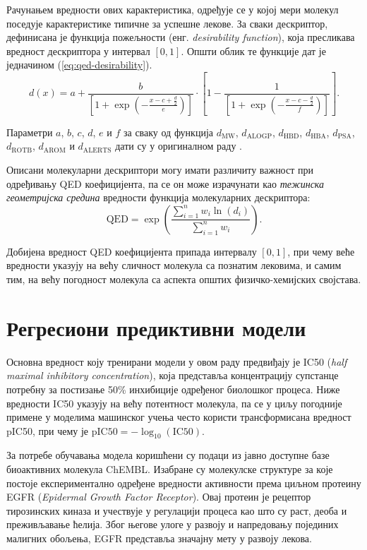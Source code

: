 \documentclass[12pt,oneside]{memoir}
\begin{document}
Рачунањем вредности ових карактеристика, одређује се у којој мери молекул поседује карактеристике типичне за успешне лекове.
За сваки дескриптор, дефинисана је функција пожељности (енг. \textit{desirability function}), која пресликава вредност дескриптора
у интервал $[0, 1]$. Општи облик те функције дат је једначином (\ref{eq:qed-desirability}).
\begin{equation}
\label{eq:qed-desirability}
d(x) = a + \frac{b}{\left[1 + \exp\left(-\frac{x - c + \frac{d}{2}}{e}\right)\right]} \cdot \left[1 - \frac{1}{\left[1 + \exp\left(-\frac{x - c - \frac{d}{2}}{f}\right)\right]}\right].
\end{equation}

Параметри $a$, $b$, $c$, $d$, $e$ и $f$ за сваку од функција $d_{\mathrm{MW}}$, $d_{\mathrm{ALOGP}}$, $d_{\mathrm{HBD}}$, $d_{\mathrm{HBA}}$, $d_{\mathrm{PSA}}$, $d_{\mathrm{ROTB}}$, $d_{\mathrm{AROM}}$ и $d_{\mathrm{ALERTS}}$ дати су у оригиналном раду \cite{Bickerton2012}.

Описани молекуларни дескриптори могу имати различиту важност при одређивању QED коефицијента, па се он може израчунати као \textit{тежинска геометријска средина} вредности функција молекуларних дескриптора:
\begin{equation}
\label{eq:qed-weighted}
\mathrm{QED} = \exp \left( \frac{\sum_{i=1}^{n} w_i \ln(d_i)}{\sum_{i=1}^{n} w_i} \right).
\end{equation}

Добијена вредност QED коефицијента припада интервалу $[0, 1]$, при чему 
веће вредности указују на већу сличност молекула са познатим лековима, 
и самим тим, на већу погодност молекула са аспекта општих 
физичко-хемијских својстава.

\section{Регресиони предиктивни модели}
\label{sec:models}

Основна 
вредност коју тренирани модели у овом раду предвиђају је IC50 
(\textit{half maximal inhibitory concentration}), која представља 
концентрацију супстанце потребну за постизање 50\% инхибиције одређеног 
биолошког процеса. Ниже вредности IC50 указују на већу потентност 
молекула, па се у циљу погодније примене у моделима машинског учења 
често користи трансформисана вредност pIC50, при чему је 
$\textrm{pIC50} = -\log_{10}(\textrm{IC50})$.

За потребе обучавања модела коришћени су подаци из јавно доступне базе 
биоактивних молекула ChEMBL. Изабране су молекулске структуре за које 
постоје експериментално одређене вредности активности према циљном 
протеину EGFR (\textit{Epidermal Growth Factor Receptor}). Овај протеин је 
рецептор тирозинских киназа и учествује у регулацији процеса као што су раст,
деоба и преживљавање ћелија. Због његове улоге у развоју и напредовању појединих
малигних обољења, EGFR представља значајну мету у развоју лекова.
\end{document}
